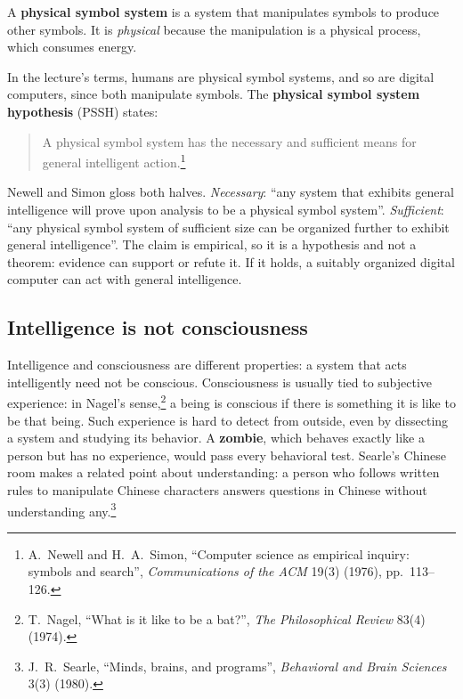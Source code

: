 \begin{definition}\label{def:pss}
  A \textbf{physical symbol system} is a system that manipulates symbols to
  produce other symbols. It is \emph{physical} because the manipulation is a
  physical process, which consumes energy.
\end{definition}

In the lecture's terms, humans are physical symbol systems, and so are digital
computers, since both manipulate symbols. The \textbf{physical symbol system
hypothesis} (PSSH) states:
\begin{quote}
  A physical symbol system has the necessary and sufficient means for general
  intelligent action.\footnote{A.~Newell and H.~A.~Simon, ``Computer science as
  empirical inquiry: symbols and search'', \emph{Communications of the ACM}
  19(3) (1976), pp.~113--126.}
\end{quote}
Newell and Simon gloss both halves. \emph{Necessary}: ``any system that
exhibits general intelligence will prove upon analysis to be a physical symbol
system''. \emph{Sufficient}: ``any physical symbol system of sufficient size can
be organized further to exhibit general intelligence''. The claim is empirical,
so it is a hypothesis and not a theorem: evidence can support or refute it. If
it holds, a suitably organized digital computer can act with general
intelligence.

\subsection{Intelligence is not consciousness}\label{sec:intro-consciousness}

Intelligence and consciousness are different properties: a system that acts
intelligently need not be conscious. Consciousness is usually tied to
subjective experience: in Nagel's sense,\footnote{T.~Nagel, ``What is it like
to be a bat?'', \emph{The Philosophical Review} 83(4) (1974).} a being is
conscious if there is something it is like to be that being. Such experience is
hard to detect from outside, even by dissecting a system and studying its
behavior. A \textbf{zombie}, which behaves exactly like a person but has no
experience, would pass every behavioral test. Searle's Chinese room makes a
related point about understanding: a person who follows written rules to
manipulate Chinese characters answers questions in Chinese without
understanding any.\footnote{J.~R.~Searle, ``Minds, brains, and programs'',
\emph{Behavioral and Brain Sciences} 3(3) (1980).}

